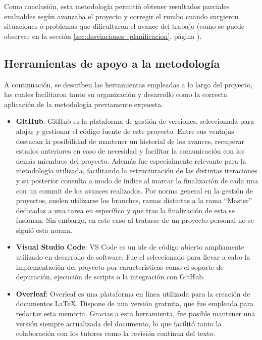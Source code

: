 Como conclusión, esta metodología permitió obtener resultados parciales evaluables según avanzaba el proyecto y corregir el rumbo 
cuando surgieron situaciones o problemas que dificultaron el avance del trabajo (como se puede observar en la sección \ref{sec:desviaciones_planificacion}, 
página \pageref{sec:desviaciones_planificacion}).

\subsection{Herramientas de apoyo a la metodología}
\label{sec:herramientas_apoyo_metodologia}

A continuación, se describen las herramientas empleadas a lo largo del proyecto, las cuales facilitaron tanto su organización y desarrollo 
como la correcta aplicación de la metodología previamente expuesta.

\begin{itemize}
    \item \textbf{GitHub}\cite{GithubWeb}: GitHub es la plataforma de gestión de versiones, seleccionada para alojar y gestionar el código fuente de este 
    proyecto. Entre sus ventajas destacan la posibilidad de mantener un historial de los avances, recuperar estados anteriores en caso de 
    necesidad y facilitar la comunicación con los demás miembros del proyecto. Además fue especialmente relevante para la metodología utilizada, 
    facilitando la estructuración de las distintas iteraciones y su posterior consulta a modo de índice al marcar la finalización de cada una 
    con un \gls{commit} de los avances realizados.  Por norma general en la gestión de proyectos, suelen utilizarse los branches, ramas distintas a la 
    rama “Master” dedicadas a una tarea en específico y que tras la finalización de esta se fusionan. Sin embargo, en este caso al tratarse de un proyecto 
    personal no se siguió esta norma.

    \item \textbf{Visual Studio Code}\cite{VSCodeWeb}: VS Code es un \Gls{ide} de código abierto ampliamente utilizado en desarrollo de software. 
    Fue el seleccionado para llevar a cabo la implementación del proyecto por características como el soporte de depuración, ejecución de scripts 
    o la integración con GitHub.

    \item \textbf{Overleaf}\cite{OverleafWeb}: Overleaf es una plataforma en línea utilizada para la creación de documentos \LaTeX\cite{LatexWeb}.
    Dispone de una versión gratuita, que fue empleada para redactar esta memoria. Gracias a esta herramienta, fue posible mantener una versión 
    siempre actualizada del documento, lo que facilitó tanto la colaboración con los tutores como la revisión continua del texto.

\end{itemize}


